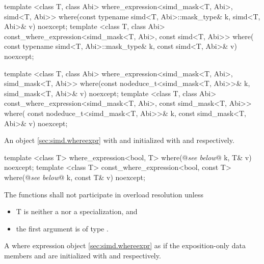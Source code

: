 \begin{itemdecl}
template <class T, class Abi>
where_expression<simd_mask<T, Abi>, simd<T, Abi>> where(const typename simd<T, Abi>::mask_type& k,
                                                        simd<T, Abi>& v) noexcept;
template <class T, class Abi>
const_where_expression<simd_mask<T, Abi>, const simd<T, Abi>> where(
    const typename simd<T, Abi>::mask_type& k, const simd<T, Abi>& v) noexcept;

template <class T, class Abi>
where_expression<simd_mask<T, Abi>, simd_mask<T, Abi>> where(const nodeduce_t<simd_mask<T, Abi>>& k,
                                                             simd_mask<T, Abi>& v) noexcept;
template <class T, class Abi>
const_where_expression<simd_mask<T, Abi>, const simd_mask<T, Abi>> where(
    const nodeduce_t<simd_mask<T, Abi>>& k, const simd_mask<T, Abi>& v) noexcept;
\end{itemdecl}
\begin{itemdescr}
  \pnum\returns An object \ref{sec:simd.whereexpr} with  and  initialized with  and  respectively.
\end{itemdescr}

\begin{itemdecl}
template <class T> where_expression<bool, T> where(@\emph{see below}@ k, T& v) noexcept;
template <class T>
const_where_expression<bool, const T> where(@\emph{see below}@ k, const T& v) noexcept;
\end{itemdecl}
\begin{itemdescr}
  \pnum\remarks The functions shall not participate in overload resolution unless
  \begin{itemize}
    \item \type T is neither a \simd nor a \mask specialization, and
    \item the first argument is of type \bool.
  \end{itemize}
  \pnum\returns A where expression object \ref{sec:simd.whereexpr} as if the exposition-only data members  and  are initialized with  and  respectively.
\end{itemdescr}

